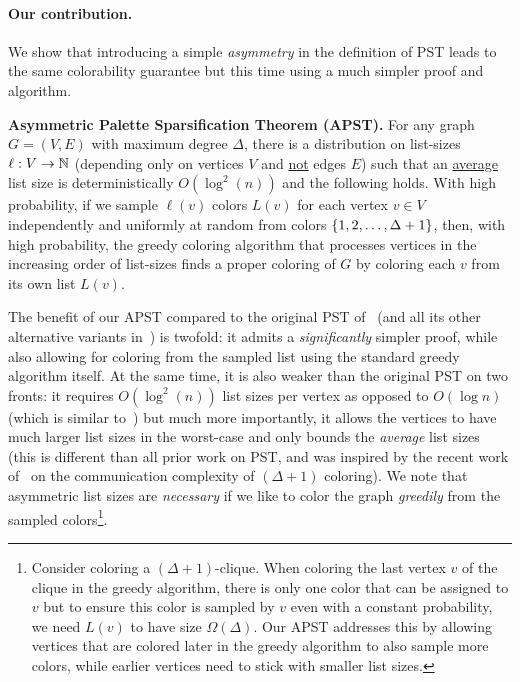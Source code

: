 \paragraph{Our contribution.} We show that introducing a simple \emph{asymmetry} in the definition of PST leads to the same colorability guarantee but this time using a much simpler proof and algorithm. 

\begin{result}
\textbf{Asymmetric Palette Sparsification Theorem (APST).}
	For any graph $G=(V,E)$ with maximum degree $\Delta$, there is a distribution on list-sizes $\ell: V \rightarrow \mathbb{N}$ (depending only on vertices $V$ and \underline{not} edges $E$) 
	such that an \underline{average} list size is deterministically $O(\log^2\!{(n)})$ and the following holds. With high probability, 
	if we sample $\ell(v)$ colors $L(v)$ for each vertex $v \in V$ independently and uniformly at random
	from colors $\left\{ 1,2,\ldots,\Delta+1 \right\}$, then, with high probability, the greedy coloring algorithm that processes vertices in the increasing order of list-sizes finds a proper coloring of $G$ by coloring 
	each $v$ from its own list $L(v)$. 
\end{result}

The benefit of our APST compared to the original PST of~\cite{AssadiCK19} (and all its other alternative variants in~\cite{AlonA20,HalldorssonKNT22,KahnK23,FlinGHKN24}) is twofold: it admits a 
\emph{significantly} simpler proof, while also allowing for coloring from the sampled list using the standard greedy algorithm itself. At the same time, it is also weaker than the original PST 
on two fronts: it requires $O(\log^2\!{(n)})$ list sizes per vertex as opposed to $O(\log{n})$ (which is similar to~\cite{HalldorssonKNT22,FlinGHKN24}) but much more importantly, it allows the vertices to have much larger 
list sizes in the worst-case and only bounds the \emph{average} list sizes (this is different than all prior work on PST, and was inspired by the recent work of~\cite{FlinM24} on the communication complexity of $(\Delta+1)$ coloring). We note that asymmetric list sizes are \emph{necessary} if we like to color the graph \emph{greedily} from the sampled colors\footnote{Consider 
coloring a $(\Delta+1)$-clique. When coloring the last vertex $v$ of the clique in the greedy algorithm, there is only one color that can be assigned to $v$ but to ensure this color is sampled by $v$ even with a constant probability, we need $L(v)$ to have 
size $\Omega(\Delta)$. Our APST addresses this by allowing vertices that are colored later in the greedy algorithm to also sample more colors, while earlier vertices need to stick with smaller list sizes.}. 

